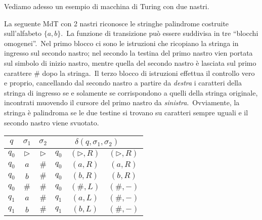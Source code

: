 Vediamo adesso un esempio di macchina di Turing con due nastri.\

\begin{example}
    \label{ex_k-nastri}
    La seguente MdT con 2 nastri riconosce le stringhe palindrome costruite sull'alfabeto $\{a, b\}$.\
    La funzione di transizione può essere suddivisa in tre ``blocchi omogenei''.\
    Nel primo blocco ci sono le istruzioni che ricopiano la stringa in ingresso sul secondo nastro; nel secondo la testina del primo nastro vien portata sul simbolo di inizio nastro, mentre quella del secondo nastro è lasciata sul primo carattere \# dopo la stringa.\
    Il terzo blocco di istruzioni effettua il controllo vero e proprio, cancellando dal secondo nastro a partire da \textit{destra} i caratteri della stringa di ingresso se e solamente se corrispondono a quelli della stringa originale, incontrati muovendo il cursore del primo nastro da \textit{sinistra}.\
    Ovviamente, la stringa è palindroma se le due testine si trovano su caratteri sempre uguali e il secondo nastro viene svuotato.\
    \begin{table}[H]
        \centering
        \begin{tabular}{ |c c c|c c c| }
            \hline
            $q$   & $\sigma_1$       & $\sigma_2$       & \multicolumn{3}{c|}{$\delta(q,\sigma_1, \sigma_2)$}                                               \\\hline\hline
            $q_0$ & $\triangleright$ & $\triangleright$ & $q_0$                                               & $(\triangleright,R)$ & $(\triangleright,R)$ \\
            $q_0$ & $a$              & $\#$             & $q_0$                                               & $(a,R)$              & $(a,R)$              \\
            $q_0$ & $b$              & $\#$             & $q_0$                                               & $(b,R)$              & $(b,R)$              \\
            $q_0$ & $\#$             & $\#$             & $q_0$                                               & $(\#,L)$             & $(\#,-)$             \\
            \hline
            $q_1$ & $a$              & $\#$             & $q_1$                                               & $(a,L)$              & $(\#,-)$             \\
            $q_1$ & $b$              & $\#$             & $q_1$                                               & $(b,L)$              & $(\#,-)$             \\

\end{tabular}
\end{table}
\end{example}
